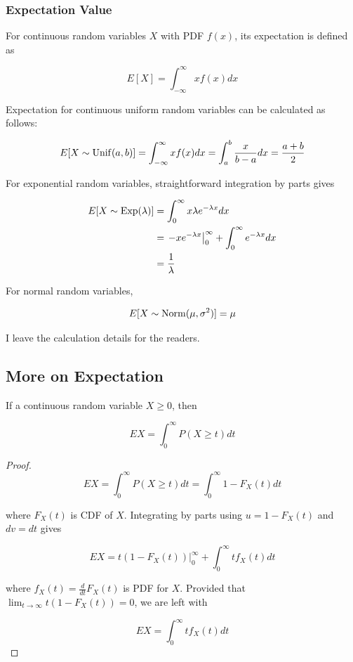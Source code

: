 \subsubsection{Expectation Value}

For continuous random variables $X$ with PDF $f(x)$, its expectation is defined as

$$E[X]=\int_{-\infty}^\infty xf(x) dx$$

Expectation for continuous uniform random variables can be calculated as follows:

$$E[X\sim \operatorname{Unif}(a,b)]=\int_{-\infty}^\infty xf(x) dx=\int_a^b \frac{x}{b-a} dx=\frac{a+b}{2}$$

For exponential random variables, straightforward integration by parts gives

\begin{align*}
	E[X\sim\operatorname{Exp}(\lambda)]&=\int_0^\infty x\lambda e^{-\lambda x} dx \\
	&=\left. -xe^{-\lambda x} \right\vert_0^\infty + \int_0^\infty e^{-\lambda x} dx \\
	&=\frac{1}{\lambda}
\end{align*}

For normal random variables,

$$E[X\sim \operatorname{Norm}(\mu, \sigma^2)]=\mu$$

I leave the calculation details for the readers. \\

\subsection{More on Expectation}

\begin{theorem}
	If a continuous random variable $X \ge 0$, then
	
	\[ EX=\int_0^\infty P(X\ge t) dt \]
\end{theorem}

\begin{proof}
	\[ EX = \int_0^\infty P(X\ge t) dt = \int_0^\infty 1-F_X(t) dt \]
	
	where $F_X(t)$ is CDF of $X$. Integrating by parts using $u=1-F_X(t)$ and $dv=dt$ gives
	
	\[ EX = \left. t (1-F_X(t)) \right\vert_0^\infty + \int_0^\infty t f_X(t) dt \]
	
	where $f_X(t)=\frac{d}{dt}F_X(t)$ is PDF for $X$. Provided that $\lim_{t\to\infty} t (1-F_X(t)) = 0$, we are left with
	
	\[ EX = \int_0^\infty t f_X(t) dt \]
\end{proof}

